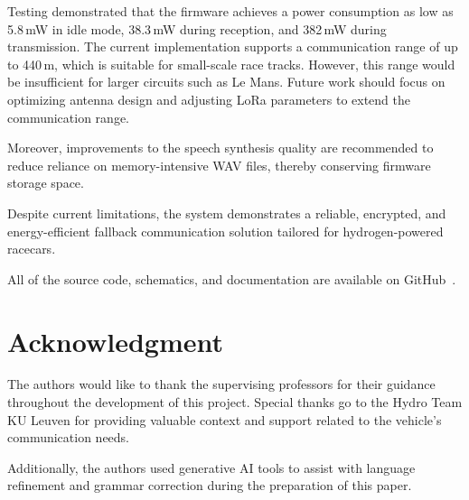 \documentclass[conference]{IEEEtran}
\begin{document}
Testing demonstrated that the firmware achieves a power consumption as low as 5.8\,mW in idle mode, 38.3\,mW during reception, and 382\,mW during transmission. 
The current implementation supports a communication range of up to 440\,m, which is suitable for small-scale race tracks. 
However, this range would be insufficient for larger circuits such as Le Mans. Future work should focus on optimizing antenna design and adjusting LoRa parameters to 
extend the communication range.

Moreover, improvements to the speech synthesis quality are recommended to reduce reliance on memory-intensive WAV files, thereby conserving firmware storage space.

Despite current limitations, the system demonstrates a reliable, encrypted, and energy-efficient fallback communication solution tailored for hydrogen-powered racecars.

All of the source code, schematics, and documentation are available on GitHub~\cite{Hydro Backup System - Organization}.

\section*{Acknowledgment}
The authors would like to thank the supervising professors for their guidance throughout the development of this project. Special thanks go to the Hydro Team KU Leuven for providing valuable context and support related to the vehicle's communication needs. 

Additionally, the authors used generative AI tools to assist with language refinement and grammar correction during the preparation of this paper.


\end{document}
